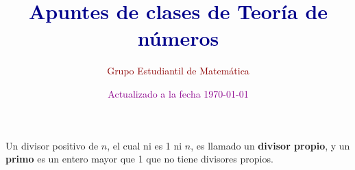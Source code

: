 \documentclass{gemnumber} %
\title{\Huge\bfseries\textcolor{DarkBlue}{Apuntes de clases de Teoría de números}}
\author{\LARGE\textcolor{DarkRed}{Grupo Estudiantil de Matemática}}
\date{\textcolor{DarkMagenta}{Actualizado a la fecha \today}}
\begin{document}
\maketitle



\newpage

\renewcommand{\contentsname}{Tabla de contenido}

\tableofcontents









Un divisor positivo de $n$, el cual ni es 1 ni $n$, es llamado un \textbf{divisor propio}, y un \textbf{primo} es un entero mayor que 1 que no tiene divisores propios.
\end{document}
